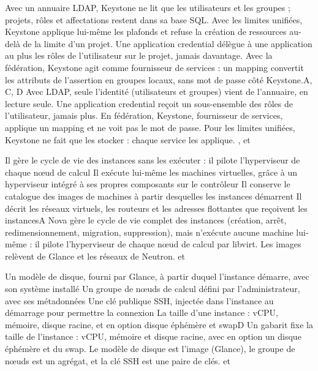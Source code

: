   {Avec un annuaire LDAP, Keystone ne lit que les utilisateurs et les groupes ; projets, rôles et affectations restent dans sa base SQL.}
  {Avec les limites unifiées, Keystone applique lui-même les plafonds et refuse la création de ressources au-delà de la limite d'un projet.}
  {Une application credential délègue à une application au plus les rôles de l'utilisateur sur le projet, jamais davantage.}
  {Avec la fédération, Keystone agit comme fournisseur de services : un mapping convertit les attributs de l'assertion en groupes locaux, sans mot de passe côté Keystone.}{A, C, D}
  {Avec LDAP, seule l'identité (utilisateurs et groupes) vient de l'annuaire, en lecture seule. Une application credential reçoit un sous-ensemble des rôles de l'utilisateur, jamais plus. En fédération, Keystone, fournisseur de services, applique un mapping et ne voit pas le mot de passe. Pour les limites unifiées, Keystone ne fait que les stocker : chaque service les applique.}
  {,  et }


  {Il gère le cycle de vie des instances sans les exécuter : il pilote l'hyperviseur de chaque nœud de calcul}
  {Il exécute lui-même les machines virtuelles, grâce à un hyperviseur intégré à ses propres composants sur le contrôleur}
  {Il conserve le catalogue des images de machines à partir desquelles les instances démarrent}
  {Il décrit les réseaux virtuels, les routeurs et les adresses flottantes que reçoivent les instances}{A}
  {Nova gère le cycle de vie complet des instances (création, arrêt, redimensionnement, migration, suppression), mais n'exécute aucune machine lui-même : il pilote l'hyperviseur de chaque nœud de calcul par libvirt. Les images relèvent de Glance et les réseaux de Neutron.}
  { et }

  {Un modèle de disque, fourni par Glance, à partir duquel l'instance démarre, avec son système installé}
  {Un groupe de nœuds de calcul défini par l'administrateur, avec ses métadonnées}
  {Une clé publique SSH, injectée dans l'instance au démarrage pour permettre la connexion}
  {La taille d'une instance : vCPU, mémoire, disque racine, et en option disque éphémère et swap}{D}
  {Un gabarit fixe la taille de l'instance : vCPU, mémoire et disque racine, avec en option un disque éphémère et du swap. Le modèle de disque est l'image (Glance), le groupe de nœuds est un agrégat, et la clé SSH est une paire de clés.}
  { et }


